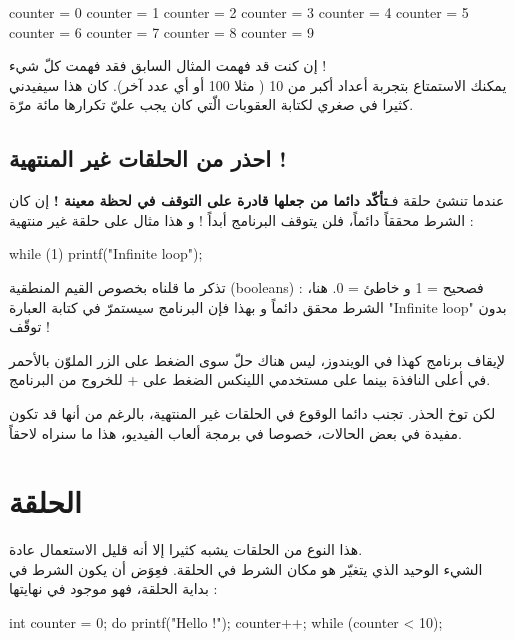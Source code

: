 \begin{Console}
counter = 0
counter = 1
counter = 2
counter = 3
counter = 4
counter = 5
counter = 6
counter = 7
counter = 8
counter = 9
\end{Console}

إن كنت قد فهمت المثال السابق فقد فهمت كلّ شيء !\\
يمكنك الاستمتاع بتجربة أعداد أكبر من 10 ( مثلا 100 أو أي عدد آخر). كان هذا سيفيدني كثيرا في صغري لكتابة العقوبات الّتي كان يجب عليّ تكرارها مائة مرّة.

\subsection{احذر من الحلقات غير المنتهية ! }

عندما تنشئ حلقة فـ\textbf{تأكّد دائما من جعلها قادرة على التوقف في لحظة معينة !}
إن كان الشرط محققاً دائماً، فلن يتوقف البرنامج أبداً ! و هذا مثال على حلقة غير منتهية :

\begin{Csource}
while (1)
{
	printf("Infinite loop\n");
}
\end{Csource}

تذكر ما قلناه بخصوص القيم المنطقية 
(\textenglish{booleans}) :
فصحيح = 1 و خاطئ = 0. هنا، الشرط محقق دائماً و بهذا فإن البرنامج سيستمرّ في كتابة العبارة 
"\textenglish{Infinite loop}"
بدون توقّف !

\begin{information}
لإيقاف برنامج كهذا في الويندوز، ليس هناك حلّ سوى الضغط على الزر 
الملوّن بالأحمر في أعلى النافذة بينما على مستخدمي اللينكس الضغط على
 + 
للخروج من البرنامج.
\end{information}
\textbf{\textbf{\textbf{}}}
لكن توخ الحذر. تجنب دائما الوقوع في الحلقات غير المنتهية، بالرغم من أنها قد تكون مفيدة في بعض الحالات، خصوصا في برمجة ألعاب الفيديو، هذا ما سنراه لاحقاً.

\section{الحلقة }

هذا النوع من الحلقات يشبه كثيرا 
إلا أنه قليل الاستعمال عادة.\\
الشيء الوحيد الذي يتغيّر هو مكان الشرط في الحلقة. فعِوَض أن يكون الشرط في بداية الحلقة، فهو موجود في نهايتها :

\begin{Csource}
int counter = 0;
do
{
	printf("Hello !\n");
	counter++;
} while (counter < 10);
\end{Csource}

